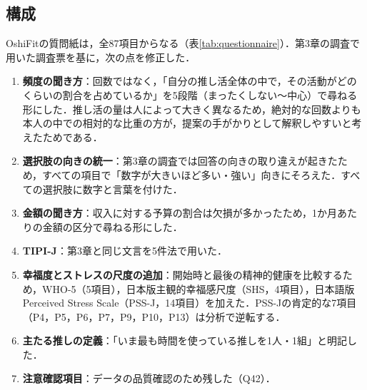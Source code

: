 \subsection{構成}
OshiFitの質問紙は，全87項目からなる（表\ref{tab:questionnaire}）．第3章の調査で用いた調査票を基に，次の点を修正した．
\begin{enumerate}
\item \textbf{頻度の聞き方}：回数ではなく，「自分の推し活全体の中で，その活動がどのくらいの割合を占めているか」を5段階（まったくしない〜中心）で尋ねる形にした．推し活の量は人によって大きく異なるため，絶対的な回数よりも本人の中での相対的な比重の方が，提案の手がかりとして解釈しやすいと考えたためである．
\item \textbf{選択肢の向きの統一}：第3章の調査では回答の向きの取り違えが起きたため，すべての項目で「数字が大きいほど多い・強い」向きにそろえた．すべての選択肢に数字と言葉を付けた．
\item \textbf{金額の聞き方}：収入に対する予算の割合は欠損が多かったため，1か月あたりの金額の区分で尋ねる形にした．
\item \textbf{TIPI-J}：第3章と同じ文言を5件法で用いた\cite{oshio2012}．
\item \textbf{幸福度とストレスの尺度の追加}：開始時と最後の精神的健康を比較するため，WHO-5（5項目）\cite{topp2015,inagaki2013}，日本版主観的幸福感尺度（SHS，4項目）\cite{shimai2004}，日本語版Perceived Stress Scale（PSS-J，14項目）\cite{mimura2008}を加えた．PSS-Jの肯定的な7項目（P4，P5，P6，P7，P9，P10，P13）は分析で逆転する．
\item \textbf{主たる推しの定義}：「いま最も時間を使っている推しを1人・1組」と明記した．
\item \textbf{注意確認項目}：データの品質確認のため残した（Q42）．
\end{enumerate}

